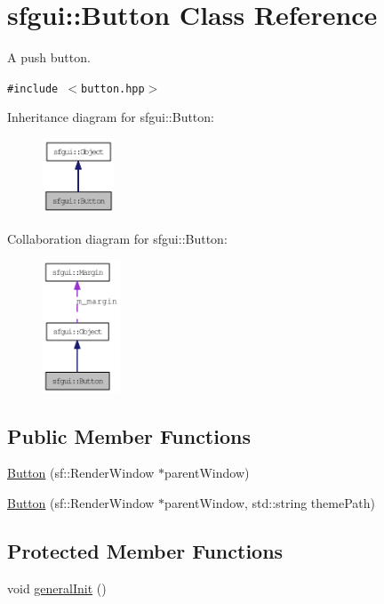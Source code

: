 \hypertarget{classsfgui_1_1Button}{
\section{sfgui::Button Class Reference}
\label{classsfgui_1_1Button}
}
A push button.  


{\tt \#include $<$button.hpp$>$}

Inheritance diagram for sfgui::Button:\nopagebreak
\begin{figure}[H]
\begin{center}
\leavevmode
\includegraphics[width=60pt]{classsfgui_1_1Button__inherit__graph}
\end{center}
\end{figure}
Collaboration diagram for sfgui::Button:\nopagebreak
\begin{figure}[H]
\begin{center}
\leavevmode
\includegraphics[width=65pt]{classsfgui_1_1Button__coll__graph}
\end{center}
\end{figure}
\subsection*{Public Member Functions}
\begin{CompactItemize}
\item 
\hyperlink{classsfgui_1_1Button_05c78461b775a073bed1e218586defd7}{Button} (sf::RenderWindow $\ast$parentWindow)
\item 
\hyperlink{classsfgui_1_1Button_5189b70c8f868718f79c7e119e0b9b32}{Button} (sf::RenderWindow $\ast$parentWindow, std::string themePath)
\end{CompactItemize}
\subsection*{Protected Member Functions}
\begin{CompactItemize}
\item 
void \hyperlink{classsfgui_1_1Button_59849e58ed4c46061d71f7172cab4e4e}{generalInit} ()
\end{CompactItemize}


